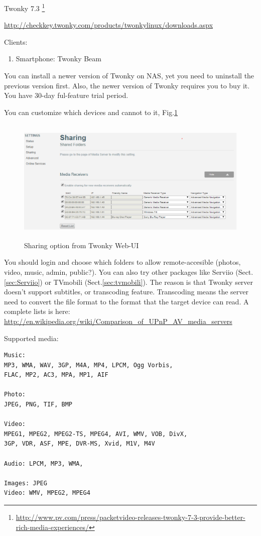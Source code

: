 Twonky 7.3
\footnote{\url{http://www.pv.com/press/packetvideo-releases-twonky-7-3-provide-better-rich-media-experiences/}}

\url{http://checkkey.twonky.com/products/twonkylinux/downloads.aspx}

Clients:
\begin{enumerate}
  \item Smartphone: Twonky Beam
\end{enumerate}

\begin{mdframed}
You can install a newer version of Twonky on NAS, yet you need to uninstall the
previous version first. Also, the newer version of Twonky requires you to buy
it. You have 30-day ful-feature trial period. 
\end{mdframed}

You can customize which devices and cannot to it, Fig.\ref{fig:Twonky_interface_01}

\begin{figure}[hbt]
  \centerline{\includegraphics[height=6cm,
    angle=0]{./images/Twonky_interface_01.eps}}
  \caption{Sharing option from Twonky Web-UI}
  \label{fig:Twonky_interface_01}
\end{figure}


You should login and choose which folders to allow remote-accesible (photos,
video, music, admin, public?).
You can also try other packages like Serviio (Sect.\ref{sec:Serviio}) or
TVmobili (Sect.\ref{sec:tvmobili}). The reason is that Twonky server doesn't
support subtitles, or transcoding feature. Transcoding means the server need to
convert the file format to the format that the target device can read. A
complete lists is here:
\url{http://en.wikipedia.org/wiki/Comparison_of_UPnP_AV_media_servers}

Supported media:
\begin{verbatim}
Music:
MP3, WMA, WAV, 3GP, M4A, MP4, LPCM, Ogg Vorbis, 
FLAC, MP2, AC3, MPA, MP1, AIF

Photo:
JPEG, PNG, TIF, BMP

Video:
MPEG1, MPEG2, MPEG2-TS, MPEG4, AVI, WMV, VOB, DivX, 
3GP, VDR, ASF, MPE, DVR-MS, Xvid, M1V, M4V

Audio: LPCM, MP3, WMA,

Images: JPEG
Video: WMV, MPEG2, MPEG4 
\end{verbatim}

